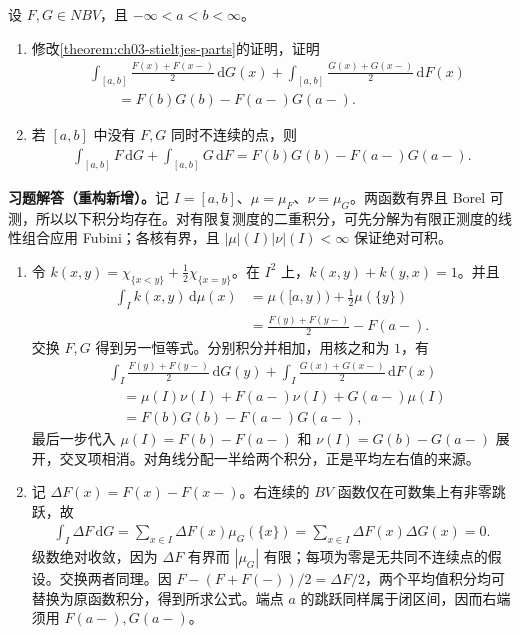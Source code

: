 \documentclass[../../main.tex]{subfiles}%
\begin{document}
\begin{exercise}\label{exercise:ch03-stieltjes-jump-parts}
设 $F,G\in NBV$，且 $-\infty<a<b<\infty$。
\begin{enumerate}
\item\label{item:ch03-stieltjes-midpoint-parts} 修改\cref{theorem:ch03-stieltjes-parts}的证明，证明
\begin{align*}
&\int_{[a,b]}\frac{F(x)+F(x-)}2\,\mathrm dG(x)
+\int_{[a,b]}\frac{G(x)+G(x-)}2\,\mathrm dF(x)\\
&\qquad=F(b)G(b)-F(a-)G(a-).
\end{align*}
\item\label{item:ch03-stieltjes-no-common-jumps} 若 $[a,b]$ 中没有 $F,G$ 同时不连续的点，则
\begin{align*}
\int_{[a,b]}F\,\mathrm dG+\int_{[a,b]}G\,\mathrm dF
=F(b)G(b)-F(a-)G(a-).
\end{align*}
\end{enumerate}
\end{exercise}
\begin{solution}
\label{solution:ch03-stieltjes-jump-parts}
\textbf{习题解答（重构新增）。}记 $I=[a,b]$、$\mu=\mu_F$、$\nu=\mu_G$。两函数有界且 Borel 可测，所以以下积分均存在。对有限复测度的二重积分，可先分解为有限正测度的线性组合应用 Fubini；各核有界，且 $|\mu|(I)|\nu|(I)<\infty$ 保证绝对可积。
\begin{enumerate}
\item 令 $k(x,y)=\chi_{\{x<y\}}+\tfrac12\chi_{\{x=y\}}$。在 $I^2$ 上，$k(x,y)+k(y,x)=1$。并且
\begin{align*}
\int_I k(x,y)\,\mathrm d\mu(x)
&=\mu([a,y))+\tfrac12\mu(\{y\})\\
&=\frac{F(y)+F(y-)}2-F(a-).
\end{align*}
交换 $F,G$ 得到另一恒等式。分别积分并相加，用核之和为 $1$，有
\begin{align*}
&\int_I\frac{F(y)+F(y-)}2\,\mathrm dG(y)
+\int_I\frac{G(x)+G(x-)}2\,\mathrm dF(x)\\
&\quad=\mu(I)\nu(I)+F(a-)\nu(I)+G(a-)\mu(I)\\
&\quad=F(b)G(b)-F(a-)G(a-),
\end{align*}
最后一步代入 $\mu(I)=F(b)-F(a-)$ 和 $\nu(I)=G(b)-G(a-)$ 展开，交叉项相消。对角线分配一半给两个积分，正是平均左右值的来源。
\item 记 $\Delta F(x)=F(x)-F(x-)$。右连续的 $BV$ 函数仅在可数集上有非零跳跃，故
\begin{align*}
\int_I\Delta F\,\mathrm dG
=\sum_{x\in I}\Delta F(x)\mu_G(\{x\})
=\sum_{x\in I}\Delta F(x)\Delta G(x)=0.
\end{align*}
级数绝对收敛，因为 $\Delta F$ 有界而 $|\mu_G|$ 有限；每项为零是无共同不连续点的假设。交换两者同理。因 $F-(F+F(-))/2=\Delta F/2$，两个平均值积分均可替换为原函数积分，得到所求公式。端点 $a$ 的跳跃同样属于闭区间，因而右端须用 $F(a-),G(a-)$。
\end{enumerate}
\end{solution}
\end{document}
